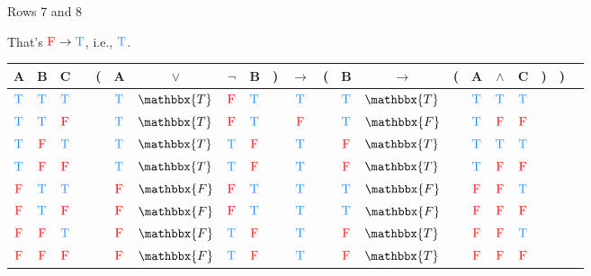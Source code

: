 \documentclass[
  ignorenonframetext,
]{beamer}
\renewcommand{\,}{\text{, }}
\def\True{\textcolor{dodgerblue}{\text{T}}}
\def\False{\textcolor{red}{\text{F}}}
\begin{document}
\begin{frame}{Rows 7 and 8}
\protect\hypertarget{rows-7-and-8-1}{}

That's \(\False \rightarrow \True\), i.e., \(\True\).

\begin{center}
\bigskip
\begin{tabular}{@{ }c@{ }@{ }c@{ }@{ }c | c@{ }@{}c@{}@{ }c@{ }@{ }c@{ }@{ }c@{ }@{ }c@{ }@{}c@{}@{ }c@{ }@{}c@{}@{ }c@{ }@{ }c@{ }@{}c@{}@{ }c@{ }@{ }c@{ }@{ }c@{ }@{}c@{}@{}c@{}@{ }c}
A & B & C &  & ( & A & $\vee$ & $\neg$ & B & ) & $\rightarrow$ & ( & B & $\rightarrow$ & ( & A & $\wedge$ & C & ) & ) & \\
\hline 
 $\True$ & $\True$ & $\True$ &  &  & $\True$ & $\mathbbx{T}$ & $\False$ & $\True$ &  &\textcolor{red}{$\True$}&  & $\True$ & $\mathbbx{T}$ &  & $\True$ & $\True$ & $\True$ &  &  & \\
 $\True$ & $\True$ & $\False$ &  &  & $\True$ & $\mathbbx{T}$ & $\False$ & $\True$ &  &\textcolor{red}{$\False$}&  & $\True$ & $\mathbbx{F}$ &  & $\True$ & $\False$ & $\False$ &  &  & \\
 $\True$ & $\False$ & $\True$ &  &  & $\True$ & $\mathbbx{T}$ & $\True$ & $\False$ &  &\textcolor{red}{$\True$}&  & $\False$ & $\mathbbx{T}$ &  & $\True$ & $\True$ & $\True$ &  &  & \\
 $\True$ & $\False$ & $\False$ &  &  & $\True$ & $\mathbbx{T}$ & $\True$ & $\False$ &  &\textcolor{red}{$\True$}&  & $\False$ & $\mathbbx{T}$ &  & $\True$ & $\False$ & $\False$ &  &  & \\
 $\False$ & $\True$ & $\True$ &  &  & $\False$ & $\mathbbx{F}$ & $\False$ & $\True$ &  &\textcolor{red}{$\True$}&  & $\True$ & $\mathbbx{F}$ &  & $\False$ & $\False$ & $\True$ &  &  & \\
 $\False$ & $\True$ & $\False$ &  &  & $\False$ & $\mathbbx{F}$ & $\False$ & $\True$ &  &\textcolor{red}{$\True$}&  & $\True$ & $\mathbbx{F}$ &  & $\False$ & $\False$ & $\False$ &  &  & \\
 $\False$ & $\False$ & $\True$ &  &  & $\False$ & $\mathbbx{F}$ & $\True$ & $\False$ &  &\textcolor{red}{$\True$}&  & $\False$ & $\mathbbx{T}$ &  & $\False$ & $\False$ & $\True$ &  &  & \\
 $\False$ & $\False$ & $\False$ &  &  & $\False$ & $\mathbbx{F}$ & $\True$ & $\False$ &  &\textcolor{red}{$\True$}&  & $\False$ & $\mathbbx{T}$ &  & $\False$ & $\False$ & $\False$ &  &  & \\
\end{tabular}
\bigskip
\end{center}

\end{frame}
\end{document}
